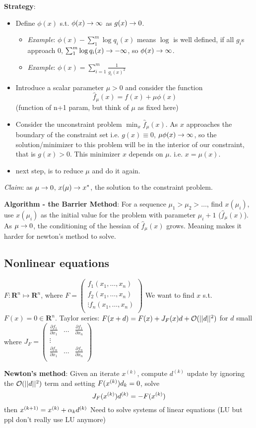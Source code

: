 \textbf{Strategy}:
\begin{itemize}
\item Define $\phi(x)$ s.t. $\phi(x)\rightarrow \infty$ as $g(x) \rightarrow 0$.
  \begin{itemize}
  \item \emph{Example}: $\phi(x) - \sum_1^m \log q_i(x)$ means $\log$ is
  well defined, if all $g_i$s approach 0, $\sum_1^m \log q_i(x)\rightarrow
  -\infty$, so $\phi(x) \rightarrow \infty$.
\item \emph{Example}: $\phi(x) = \sum_{i=1}^m \frac{1}{g_i(x)^2}$
  \end{itemize}
\item Introduce a scalar parameter $\mu>0$ and consider the function
  $$\hat f_\mu(x)=f(x) + \mu \phi(x)$$ (function of n+1 param, but think of $\mu$ as fixed here)
\item Consider the unconstraint problem $\min_x \hat f_\mu(x)$. As
$x$ approaches the boundary of the constraint set i.e. $g(x)\equiv 0$,
$\mu\phi(x)\rightarrow \infty$, so the solution/minimizer to this problem will be in
the interior of our constraint, that is $g(x)>0$. This minimizer $x$
depends on $\mu$. i.e. $x=\mu(x)$.
\item next step, is to reduce $\mu$ and do it again.

\end{itemize}
\emph{Claim}: as $\mu\rightarrow 0$, $x(\mu)\rightarrow x^*$, the solution to the
constraint problem.

\textbf{Algorithm - the Barrier Method}: For a sequence $\mu_1 > \mu_2 > \dots$, find $x(\mu_i)$, use
$x(\mu_i)$ as the initial value for the problem with parameter
$\mu_i+1$ ($\hat f_\mu(x)$). As $\mu\rightarrow 0$, the conditioning of the hessian of $\hat
f_\mu(x)$ grows. Meaning makes it harder for newton's method to solve.

\subsection{Nonlinear equations}
$F:\mathbf{R}^n \mapsto \mathbf{R}^n$, where $F=
\begin{pmatrix}
f_1(x_1, \dots, x_n)  \\
f_2(x_1, \dots, x_n)  \\
\vdots
f_n(x_1, \dots, x_n)  \\
\end{pmatrix}$
We want to find $x$ s.t. $F(x) = 0\in\mathbf{R}^n$.
Taylor series: $F(x+d) = F(x) + J_F(x)d + \mathcal{O}(||d||^2)$ for
$d$ small where $J_F =
\begin{pmatrix}
\frac{\partial f_1}{\partial x_1}&\dots &\frac{\partial f_1}{\partial
  x_n}\\
\vdots\\
\frac{\partial f_n}{\partial x_1}&\dots &\frac{\partial f_n}{\partial
  x_n}\\
\end{pmatrix}$

\textbf{Newton's method}: Given an iterate $x^{(k)}$, compute
$d^{(k)}$ update by ignoring the $\mathcal{O}(||d||^2)$ term and setting
$F(x^{(k)})d_k = 0$, solve $$J_F(x^{(k)})d^{(k)} = -F(x^{(k)})$$
then $x^{(k+1)}  = x^{(k)} + \alpha_kd^{(k)}$
Need to solve systems of linear equations (LU but ppl don't really use LU anymore)




